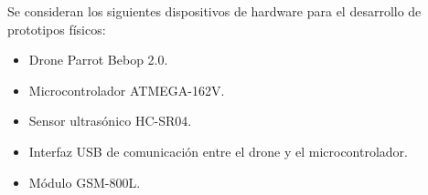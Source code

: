 %
%

Se consideran los siguientes dispositivos de hardware para el desarrollo de 
prototipos físicos:

\begin{itemize}
	\item Drone Parrot Bebop 2.0.
	\item Microcontrolador ATMEGA-162V.
	\item Sensor ultrasónico HC-SR04.
	\item Interfaz USB de comunicación entre el drone y el microcontrolador.
	\item Módulo GSM-800L.
\end{itemize}
